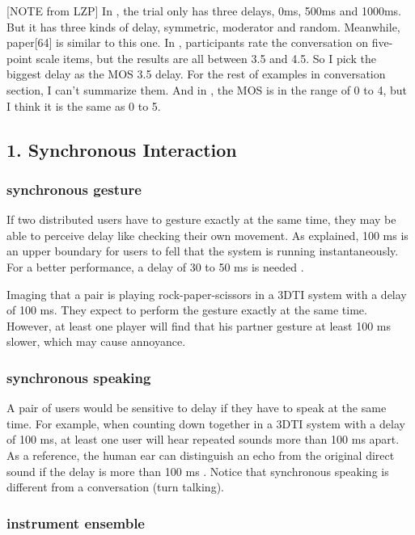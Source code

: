 [NOTE from LZP] In \cite{schmitt2014asymmetric}, the trial only has three delays, 0ms, 500ms and 1000ms. But it has three kinds of delay, symmetric, moderator and random. Meanwhile, paper[64] is similar to this one.
In \cite{tam2012video}, participants rate the conversation on five-point scale items, but the results are all between 3.5 and 4.5. So I pick the biggest delay as the MOS 3.5 delay.
For the rest of examples in conversation section, I can't summarize them. And in \cite{kitawaki1991sub}, the MOS is in the range of 0 to 4, but I think it is the same as 0 to 5.


\subsection{1. Synchronous Interaction}


\subsubsection{synchronous gesture}

If two distributed users have to gesture exactly at the same time, they may be able to perceive delay like checking their own movement. As \cite{nielsen1993response} explained, 100 ms is an upper boundary for users to fell that the system is running instantaneously. For a better performance, a delay of 30 to 50 ms is needed \cite{chen2007review}.

Imaging that a pair is playing rock-paper-scissors in a 3DTI system with a delay of 100 ms. They expect to perform the gesture exactly at the same time. However, at least one player will find that his partner gesture at least 100 ms slower, which may cause annoyance.

\subsubsection{synchronous speaking}

A pair of users would be sensitive to delay if they have to speak at the same time. For example, when counting down together in a 3DTI system with a delay of 100 ms, at least one user will hear repeated sounds more than 100 ms apart. As a reference, the human ear can distinguish an echo from the original direct sound if the delay is more than 100 ms \cite{wolfel2009distant}. Notice that synchronous speaking is different from a conversation (turn talking).

\subsubsection{instrument ensemble}

